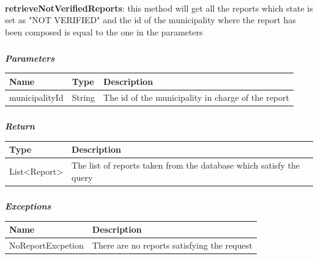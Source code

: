 						\paragraph{}
							\textbf{retrieveNotVerifiedReports}: this method will get all the reports which state is set as "NOT VERIFIED" and the id of the municipality where the report has been composed is equal to the one in the parameters
							\subparagraph{}
							\textit{\textbf{Parameters}}
							\vspace{-2mm}
								\begin{table}[!h]
									\begin{tabular}{L{0.2\textwidth}L{0.15\textwidth}L{0.45\textwidth}}
										\toprule
										\textbf{Name} & \textbf{Type} & Description \\
										\midrule
								  		municipalityId & String & The id of the municipality in charge of the report \\
								 		\bottomrule
									\end{tabular}
								\end{table}
							\vspace{-6mm}
							\subparagraph{}
								\textit{\textbf{Return}}
								\vspace{-2mm}
									\begin{table}[!h]
									\begin{tabular}{L{0.35\textwidth}L{0.45\textwidth}}
										\toprule
										\textbf{Type} & \textbf{Description} \\
										\midrule
										List<Report> & The list of reports taken from the database which satisfy the query \\
								 		\bottomrule
									\end{tabular}
								\end{table}
							\vspace{-6mm}
							\subparagraph{}
								\textit{\textbf{Exceptions}}
								\vspace{-2mm}
									\begin{table}[!h]
									\begin{tabular}{ll}
										\toprule
										\textbf{Name} & \textbf{Description} \\
										\midrule
								  		NoReportExcpetion & There are no reports satisfying the request \\
								 		\bottomrule
									\end{tabular}
								\end{table}
					
